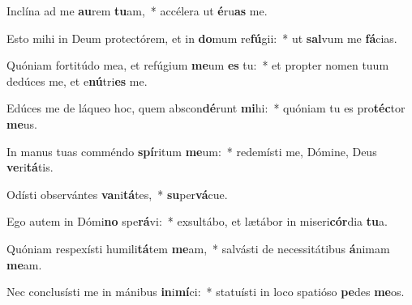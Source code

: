\item Inclína ad me \textbf{au}rem \textbf{tu}am,~* accélera ut \textbf{é}ru\textbf{as} me.
\item Esto mihi in Deum protectórem, et in \textbf{do}mum re\textbf{fú}gii:~* ut \textbf{sal}vum me \textbf{fá}cias.
\item Quóniam fortitúdo mea, et refúgium \textbf{me}um \textbf{es} tu:~* et propter nomen tuum dedúces me, et e\textbf{nú}tri\textbf{es} me.
\item Edúces me de láqueo hoc, quem abscon\textbf{dé}runt \textbf{mi}hi:~* quóniam tu es pro\textbf{téc}tor \textbf{me}us.
\item In manus tuas comméndo \textbf{spí}ritum \textbf{me}um:~* redemísti me, Dómine, Deus \textbf{ve}ri\textbf{tá}tis.
\item Odísti observántes \textbf{va}ni\textbf{tá}tes,~* \textbf{su}per\textbf{vá}cue.
\item Ego autem in Dómi\textbf{no} spe\textbf{rá}vi:~* exsultábo, et lætábor in miseri\textbf{cór}dia \textbf{tu}a.
\item Quóniam respexísti humili\textbf{tá}tem \textbf{me}am,~* salvásti de necessitátibus \textbf{á}nimam \textbf{me}am.
\item Nec conclusísti me in mánibus \textbf{in}i\textbf{mí}ci:~* statuísti in loco spatióso \textbf{pe}des \textbf{me}os.
